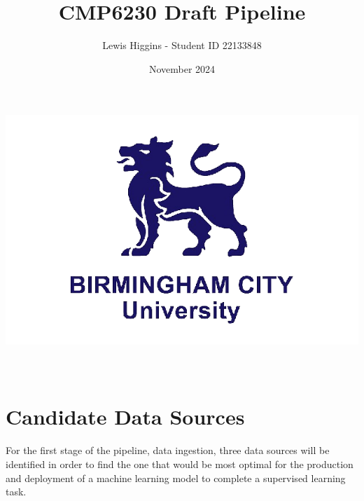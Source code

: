 \documentclass[12pt]{report}
\title{CMP6230 Draft Pipeline}
\author{Lewis Higgins - Student ID 22133848}
\date{November 2024}
\begin{document}
\makeatletter
\begin{titlepage}
    \begin{center}
        \includegraphics[width=0.7\linewidth]{BCU}\\[4ex]
        {\huge \bfseries  \@title }\\[50ex]
        {\@author}\\[30ex]
    \end{center}
\end{titlepage}
\makeatother
\thispagestyle{empty}
\newpage


\setcounter{page}{0}

\tableofcontents
\thispagestyle{empty}


\chapter{Candidate Data Sources}
For the first stage of the pipeline, data ingestion, three data sources will be identified in order to find 
the one that would be most optimal for the production and deployment of a machine learning model to complete 
a supervised learning task.

\end{document}
